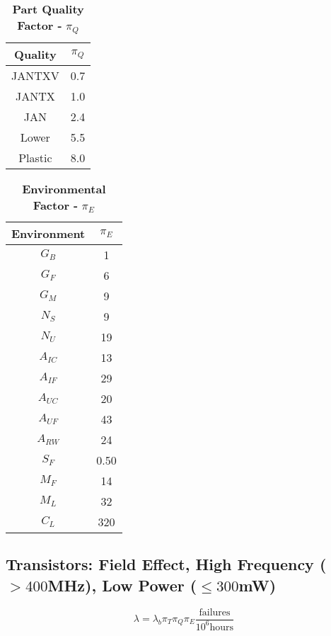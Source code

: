 \begin{table}[h]
\caption{\textbf{Part Quality  Factor -}  $\pi_{Q}$}
\label{table:baseFailRateMosLow}
\begin{tabular}{|c|c|} \hline
\rowcolor{Gray}
\textbf{Quality} & $\pi_{Q}$ \\ \hline
JANTXV & 0.7 \\ \hline
JANTX & 1.0 \\ \hline
JAN & 2.4 \\ \hline
Lower & 5.5 \\ \hline
Plastic & 8.0 \\ \hline
\end{tabular}
\end{table}


\begin{table}[h]
\caption{\textbf{Environmental Factor -} $\pi_{E}$}
\label{table:envFactorMosLow}
\begin{tabular}{|c|c|} \hline
\rowcolor{Gray}
\textbf{Environment} & $\pi_{E}$ \\ \hline
$G_{B}$ & 1 \\ \hline
$G_{F}$ & 6 \\ \hline
$G_{M}$ & 9 \\ \hline
$N_{S}$ & 9 \\ \hline
$N_{U}$ & 19 \\ \hline
$A_{IC}$ & 13 \\ \hline
$A_{IF}$ & 29 \\ \hline
$A_{UC}$ & 20 \\ \hline
$A_{UF}$ & 43 \\ \hline
$A_{RW}$ & 24 \\ \hline
$S_{F}$ & 0.50 \\ \hline
$M_{F}$ & 14 \\ \hline
$M_{L}$ & 32 \\ \hline
$C_{L}$ & 320 \\ \hline
\end{tabular}
\end{table}

\newpage

\subsection{Transistors: Field Effect, High Frequency ($> 400$MHz), Low Power ($\leq 300$mW)}
\label{subsection:transistors-field-effect-high-frequency-400mhz-low-power-300mw}

$$\lambda = \lambda_{b} \pi_{T} \pi_{Q} \pi_{E} \frac{\text{failures}}{10^{6} \text{hours}}$$


